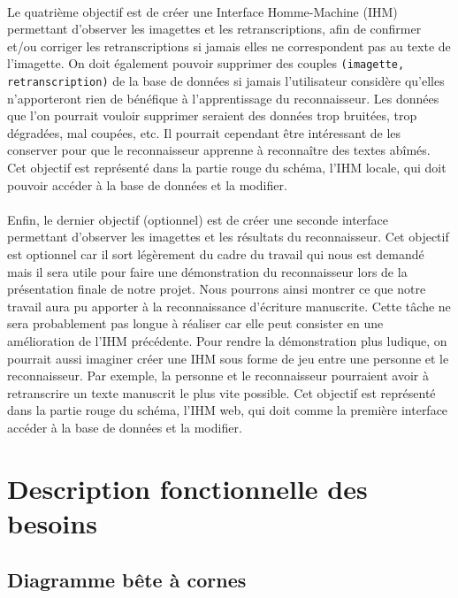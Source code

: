 \newpage
\paragraph{}
Le quatrième objectif est de créer une Interface Homme-Machine (IHM) permettant d’observer les imagettes
et les retranscriptions, afin de confirmer et/ou corriger les retranscriptions si jamais elles ne correspondent
pas au texte de l’imagette. On doit également pouvoir supprimer des couples \texttt{(imagette, retranscription)}
de la base de données si jamais l’utilisateur considère qu’elles n’apporteront rien de bénéfique
à l’apprentissage du reconnaisseur. Les données que l'on pourrait vouloir supprimer seraient des
données trop bruitées, trop dégradées, mal coupées, etc. Il pourrait cependant être intéressant
de les conserver pour que le reconnaisseur apprenne à reconnaître des textes abîmés. Cet objectif est représenté
dans la partie rouge du schéma, l'IHM locale, qui doit pouvoir accéder à la base de données et la modifier.

\paragraph{}
Enfin, le dernier objectif (optionnel) est de créer une seconde interface permettant
d’observer les imagettes et les résultats du reconnaisseur. Cet objectif est optionnel
car il sort légèrement du cadre du travail qui nous est demandé mais il sera utile pour faire
une démonstration du reconnaisseur lors de la présentation finale de notre projet.
Nous pourrons ainsi montrer ce que notre travail aura pu apporter à la reconnaissance
d’écriture manuscrite. Cette tâche ne sera probablement pas longue à réaliser car elle peut
consister en une amélioration de l’IHM précédente. Pour rendre la démonstration plus
ludique, on pourrait aussi imaginer créer une IHM sous forme de jeu entre une personne
et le reconnaisseur. Par exemple, la personne et le reconnaisseur pourraient avoir à
retranscrire un texte manuscrit le plus vite possible. Cet objectif est représenté dans
la partie rouge du schéma, l'IHM web, qui doit comme la première interface
accéder à la base de données et la modifier.

\section{Description fonctionnelle des besoins}

\subsection{Diagramme bête à cornes}

